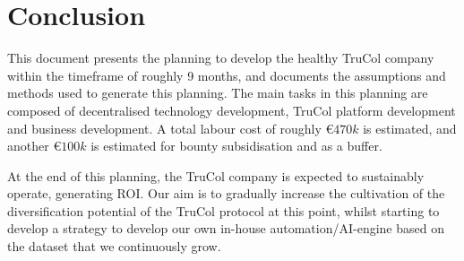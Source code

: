 \section{Conclusion}\label{sec:conclusion}
This document presents the planning to develop the healthy TruCol company within the timeframe of roughly 9 months, and documents the assumptions and methods used to generate this planning. The main tasks in this planning are composed of decentralised technology development, TruCol platform development and business development. A total labour cost of roughly \euro$470k$ is estimated, and another \euro$100k$ is estimated for bounty subsidisation and as a buffer.

At the end of this planning, the TruCol company is expected to sustainably operate, generating ROI. Our aim is to gradually increase the cultivation of the diversification potential of the TruCol protocol at this point, whilst starting to develop a strategy to develop our own in-house automation/AI-engine based on the dataset that we continuously grow.